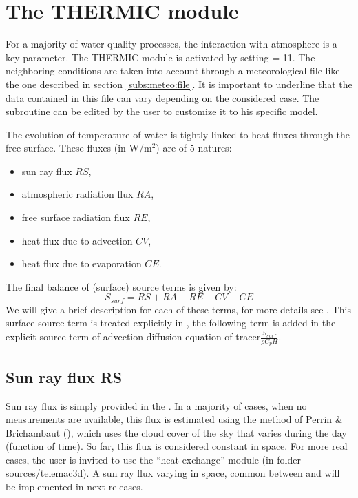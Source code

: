 \chapter{The THERMIC module}
\label{subs:therm:mod}
For a majority of water quality processes, the interaction with atmosphere is a key parameter.
The THERMIC module is activated by setting  = 11.
The neighboring conditions are taken into account through a meteorological file
like the one described in section \ref{subs:meteo:file}.
It is important to underline that the data contained in this file
can vary depending on the considered case.
The subroutine  can be edited by the user to customize it to his specific model.

The evolution of temperature of water is tightly linked to heat fluxes through the free surface.
These fluxes (in W/m$^2$) are of 5 natures:

\begin{itemize}
\item sun ray flux $RS$,
\item atmospheric radiation flux $RA$,
\item free surface radiation flux $RE$,
\item heat flux due to advection $CV$,
\item heat flux due to evaporation $CE$.
\end{itemize}

The final balance of (surface) source terms is given by:
\[S_{surf}=RS+RA-RE-CV-CE\]
We will give a brief description for each of these terms, for more details see \cite{El-Kadi2012}.
This surface source term is treated explicitly in ,
the following term is added in the explicit source term of advection-diffusion equation
of tracer$\frac{S_{surf}}{\rho C_pH}$.


\section{Sun ray flux RS}

Sun ray flux is simply provided in the .
In a majority of cases, when no measurements are available,
this flux is estimated using the method of Perrin \& Brichambaut (\cite{El-Kadi2012}),
which uses the cloud cover of the sky that varies during the day (function of time).
So far, this flux is considered constant in space.
For more real cases, the user is invited to use the ``heat exchange'' module
(in folder sources/telemac3d).
A sun ray flux varying in space, common between  and  will be implemented in next releases.



